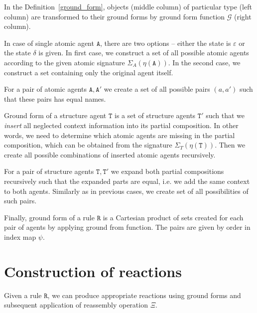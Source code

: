 \documentclass[12pt]{fithesis2}
\begin{document}
In the Definition~\ref{ground_form}, objects (middle column) of particular type (left column) are transformed to their ground forms by ground form function $\mathcal{G}$ (right column).

In case of single atomic agent $\mathtt{A}$, there are two options -- either the state is $\varepsilon$ or the state $\delta$ is given. In first case, we construct a set of all possible atomic agents according to the given atomic signature $\Sigma_A(\eta(\mathtt{A}))$. In the second case, we construct a set containing only the original agent itself.

For a pair of atomic agents $\mathtt{A}, \mathtt{A}'$ we create a set of all possible pairs $(a, a')$ such that these pairs has equal names.

Ground form of a structure agent $\mathtt{T}$ is a set of structure agents $\mathtt{T}'$ such that we \emph{insert} all neglected context information into its partial composition. In other words, we need to determine which atomic agents are missing in the partial composition, which can be obtained from the signature $\Sigma_T(\eta(\mathtt{T}))$. Then we create all possible combinations of inserted atomic agents recursively.

For a pair of structure agents $\mathtt{T}, \mathtt{T}'$ we expand both partial compositions recursively such that the expanded parts are equal, i.e. we add the same context to both agents. Similarly as in previous cases, we create set of all possibilities of such pairs.

Finally, ground form of a rule $\mathtt{R}$ is a Cartesian product of sets created for each pair of agents by applying ground from function. The pairs are given by order in index map $\psi$.

\section{Construction of reactions}
\label{Generating reactions}

Given a rule $\mathtt{R}$, we can produce appropriate reactions using ground forms and subsequent application of reassembly operation $\Xi$.
\end{document}
